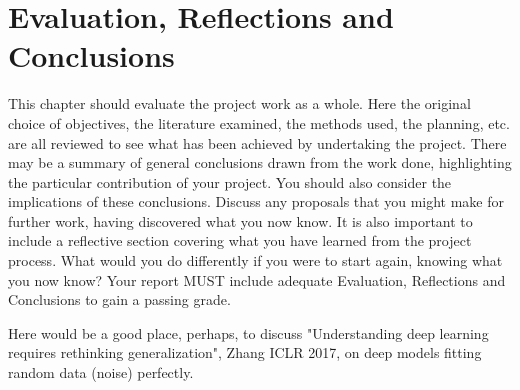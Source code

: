 
\chapter{Evaluation, Reflections and Conclusions}

\label{Eval} 

This chapter should evaluate the project work as a whole. Here the original choice of objectives, the literature examined, the methods used, the planning, etc. are all reviewed to see what has been achieved by undertaking the project. There may be a summary of general conclusions drawn from the work done, highlighting the particular contribution of your project. You should also consider the implications of these conclusions. Discuss any proposals that you might make for further work, having discovered what you now know. It is also important to include a reflective section covering what you have learned from the project process. What would you do differently if you were to start again, knowing what you now know? Your report MUST include adequate Evaluation, Reflections and Conclusions to gain a passing grade.  

Here would be a good place, perhaps, to discuss "Understanding deep learning requires rethinking generalization", Zhang ICLR 2017, on deep models fitting random data (noise) perfectly.  